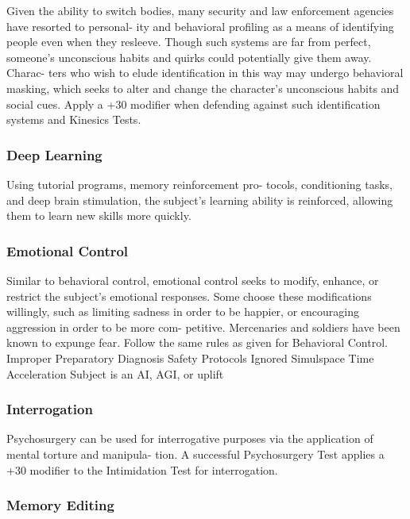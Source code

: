 Given the ability to switch bodies, many security and 
law enforcement agencies have resorted to personal-
ity and behavioral profiling as a means of identifying 
people even when they resleeve. Though such systems 
are far from perfect, someone's unconscious habits 
and quirks could potentially give them away. Charac-
ters who wish to elude identification in this way may 
undergo behavioral masking, which seeks to alter and 
change the character's unconscious habits and social 
cues. Apply a +30 modifier when defending against 
such identification systems and Kinesics Tests.

\subsubsection{Deep Learning}

Using tutorial programs, memory reinforcement pro-
tocols, conditioning tasks, and deep brain stimulation, 
the subject's learning ability is reinforced, allowing 
them to learn new skills more quickly.

\subsubsection{Emotional Control}

Similar to behavioral control, emotional control seeks 
to modify, enhance, or restrict the subject's emotional 
responses. Some choose these modifications willingly, 
such as limiting sadness in order to be happier, or 
encouraging aggression in order to be more com-
petitive. Mercenaries and soldiers have been known 
to expunge fear. Follow the same rules as given for 
Behavioral Control.
Improper Preparatory Diagnosis
Safety Protocols Ignored
Simulspace Time Acceleration
Subject is an AI, AGI, or uplift             

\subsubsection{Interrogation}

Psychosurgery can be used for interrogative purposes 
via the application of mental torture and manipula-
tion. A successful Psychosurgery Test applies a +30 
modifier to the Intimidation Test for interrogation.

\subsubsection{Memory Editing}

